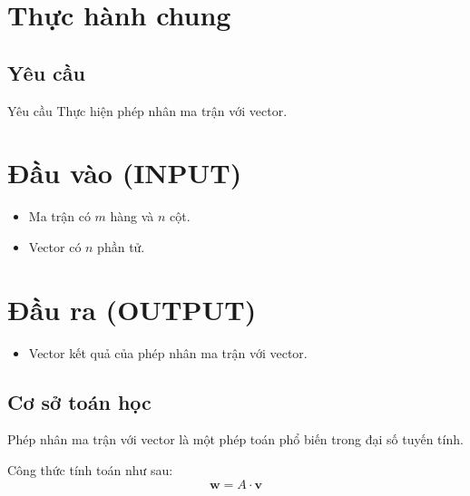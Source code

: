 \newpage
\section{Thực hành chung}
\subsection{Yêu cầu}




\begin{block}{Yêu cầu}  
Thực hiện phép nhân ma trận với vector.

    
   


\section*{Đầu vào (INPUT)}

\begin{itemize}
    \item Ma trận  có \(m\) hàng và \(n\) cột. 
    \item Vector   có \(n\) phần tử.  
\end{itemize}

\section*{Đầu ra (OUTPUT)}

\begin{itemize}
    \item Vector  kết quả của phép nhân ma trận  với vector.
\end{itemize}
 


\end{block} 




\subsection{Cơ sở toán học}
Phép nhân ma trận với vector là một phép toán phổ biến trong đại số tuyến tính.

Công thức tính toán như sau:
\[ \mathbf{w} = A \cdot \mathbf{v} \]

